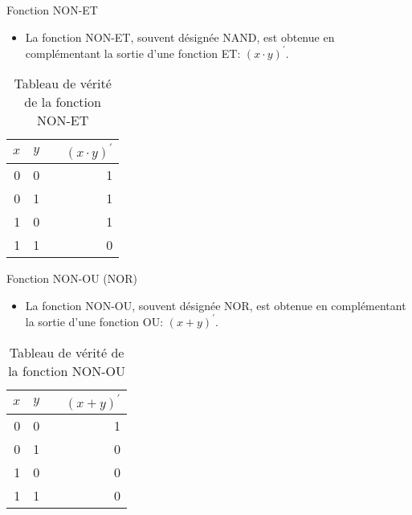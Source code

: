 \documentclass[presentation]{beamer}
\begin{document}
\begin{frame}[label={sec:org4b1cdf6}]{Fonction NON-ET}
\begin{itemize}
\item La fonction NON-ET, souvent désignée NAND, est obtenue en complémentant la sortie d'une fonction ET: \((x \cdot y)^\prime\).
\end{itemize}

\begin{table}[htbp]
\caption{\label{tab:orgea5b85f}Tableau de vérité de la fonction NON-ET}
\centering
\begin{tabular}{rrlr}
\(x\) & \(y\) &  & \((x \cdot y)^\prime\)\\[0pt]
\hline
0 & 0 &  & 1\\[0pt]
0 & 1 &  & 1\\[0pt]
1 & 0 &  & 1\\[0pt]
1 & 1 &  & 0\\[0pt]
\end{tabular}
\end{table}
\end{frame}

\begin{frame}[label={sec:org1b073b9}]{Fonction NON-OU (NOR)}
\begin{itemize}
\item La fonction NON-OU, souvent désignée NOR, est obtenue en complémentant la sortie d'une fonction OU: \((x + y)^\prime\).
\end{itemize}

\begin{table}[htbp]
\caption{\label{tab:org11af41f}Tableau de vérité de la fonction NON-OU}
\centering
\begin{tabular}{rrlr}
\(x\) & \(y\) &  & \((x + y)^\prime\)\\[0pt]
\hline
0 & 0 &  & 1\\[0pt]
0 & 1 &  & 0\\[0pt]
1 & 0 &  & 0\\[0pt]
1 & 1 &  & 0\\[0pt]
\end{tabular}
\end{table}
\end{frame}
\end{document}
